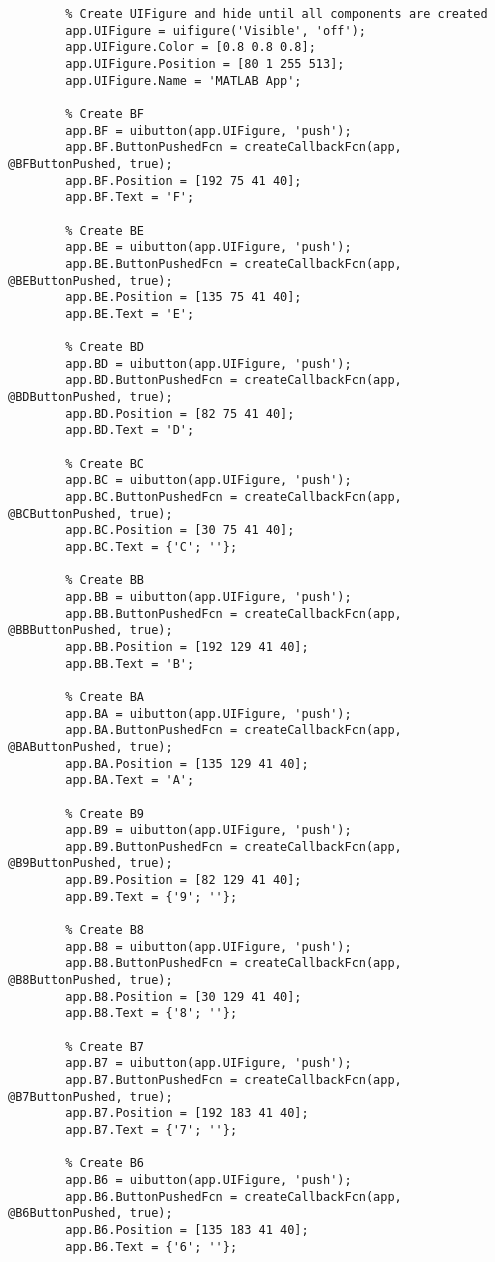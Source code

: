 \documentclass[11pt]{article}
\begin{document}
\begin{verbatim}
	    % Create UIFigure and hide until all components are created
	    app.UIFigure = uifigure('Visible', 'off');
	    app.UIFigure.Color = [0.8 0.8 0.8];
	    app.UIFigure.Position = [80 1 255 513];
	    app.UIFigure.Name = 'MATLAB App';

	    % Create BF
	    app.BF = uibutton(app.UIFigure, 'push');
	    app.BF.ButtonPushedFcn = createCallbackFcn(app, @BFButtonPushed, true);
	    app.BF.Position = [192 75 41 40];
	    app.BF.Text = 'F';

	    % Create BE
	    app.BE = uibutton(app.UIFigure, 'push');
	    app.BE.ButtonPushedFcn = createCallbackFcn(app, @BEButtonPushed, true);
	    app.BE.Position = [135 75 41 40];
	    app.BE.Text = 'E';

	    % Create BD
	    app.BD = uibutton(app.UIFigure, 'push');
	    app.BD.ButtonPushedFcn = createCallbackFcn(app, @BDButtonPushed, true);
	    app.BD.Position = [82 75 41 40];
	    app.BD.Text = 'D';

	    % Create BC
	    app.BC = uibutton(app.UIFigure, 'push');
	    app.BC.ButtonPushedFcn = createCallbackFcn(app, @BCButtonPushed, true);
	    app.BC.Position = [30 75 41 40];
	    app.BC.Text = {'C'; ''};

	    % Create BB
	    app.BB = uibutton(app.UIFigure, 'push');
	    app.BB.ButtonPushedFcn = createCallbackFcn(app, @BBButtonPushed, true);
	    app.BB.Position = [192 129 41 40];
	    app.BB.Text = 'B';

	    % Create BA
	    app.BA = uibutton(app.UIFigure, 'push');
	    app.BA.ButtonPushedFcn = createCallbackFcn(app, @BAButtonPushed, true);
	    app.BA.Position = [135 129 41 40];
	    app.BA.Text = 'A';

	    % Create B9
	    app.B9 = uibutton(app.UIFigure, 'push');
	    app.B9.ButtonPushedFcn = createCallbackFcn(app, @B9ButtonPushed, true);
	    app.B9.Position = [82 129 41 40];
	    app.B9.Text = {'9'; ''};

	    % Create B8
	    app.B8 = uibutton(app.UIFigure, 'push');
	    app.B8.ButtonPushedFcn = createCallbackFcn(app, @B8ButtonPushed, true);
	    app.B8.Position = [30 129 41 40];
	    app.B8.Text = {'8'; ''};

	    % Create B7
	    app.B7 = uibutton(app.UIFigure, 'push');
	    app.B7.ButtonPushedFcn = createCallbackFcn(app, @B7ButtonPushed, true);
	    app.B7.Position = [192 183 41 40];
	    app.B7.Text = {'7'; ''};

	    % Create B6
	    app.B6 = uibutton(app.UIFigure, 'push');
	    app.B6.ButtonPushedFcn = createCallbackFcn(app, @B6ButtonPushed, true);
	    app.B6.Position = [135 183 41 40];
	    app.B6.Text = {'6'; ''};


\end{verbatim}
\end{document}
